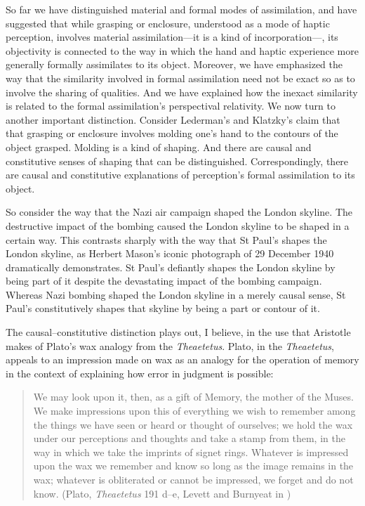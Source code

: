 So far we have distinguished material and formal modes of assimilation, and have suggested that while grasping or enclosure, understood as a mode of haptic perception, involves material assimilation---it is a kind of incorporation---, its objectivity is connected to the way in which the hand and  haptic experience more generally formally assimilates to its object. Moreover, we have emphasized the way that the similarity involved in formal assimilation need not be exact so as to involve the sharing of qualities. And we have explained how the inexact similarity is related to the formal assimilation's perspectival relativity. We now turn to another important distinction. Consider Lederman's and Klatzky's \citeyearpar{Lederman:1987fr} claim that that grasping or enclosure involves molding one's hand to the contours of the object grasped. Molding is a kind of shaping. And there are causal and constitutive senses of shaping that can be distinguished. Correspondingly, there are causal and constitutive explanations of perception's formal assimilation to its object.

So consider the way that the Nazi air campaign shaped the London skyline. The destructive impact of the bombing caused the London skyline to be shaped in a certain way. This contrasts sharply with the way that St Paul's shapes the London skyline, as Herbert Mason's iconic photograph of 29 December 1940 dramatically demonstrates. St Paul's defiantly shapes the London skyline by being part of it despite the devastating impact of the bombing campaign. Whereas Nazi bombing shaped the London skyline in a merely causal sense, St Paul's constitutively shapes that skyline by being a part or contour of it.

The causal--constitutive distinction plays out, I believe, in the use that Aristotle makes of Plato's wax analogy from the \emph{Theaetetus}. Plato, in the \emph{Theaetetus}, appeals to an impression made on wax as an analogy for the operation of memory in the context of explaining how error in judgment is possible:
\begin{quote}
	We may look upon it, then, as a gift of Memory, the mother of the Muses. We make impressions upon this of everything we wish to remember among the things we have seen or heard or thought of ourselves; we hold the wax under our perceptions and thoughts and take a stamp from them, in the way in which we take the imprints of signet rings. Whatever is impressed upon the wax we remember and know so long as the image remains in the wax; whatever is obliterated or cannot be impressed, we forget and do not know. (Plato, \emph{Theaetetus} 191 d--e, Levett and Burnyeat in \citealt[212]{Cooper:1997fk})
\end{quote}

